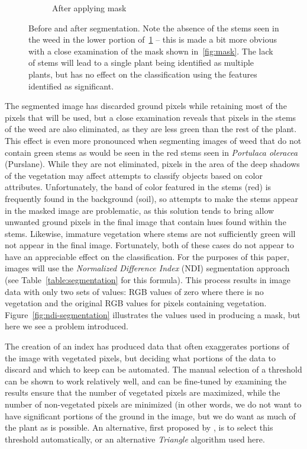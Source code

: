 \documentclass[letterpaper]{article}
\begin{document}
{{\begin{figure}[H]
\begin{subfigure}[h]{.30\textwidth}
	  \caption{After applying mask}
	  \label{fig:original-masked}
	\end{subfigure}
	\caption[Before and after segmentation]{Before and after segmentation. Note the absence of the stems seen in the weed in the lower portion of~\ref{fig:original-masked} -- this is made a bit more obvious with a close examination of the mask shown in~\ref{fig:mask}. The lack of stems will lead to a single plant being identified as multiple plants, but has no effect on the classification using the features identified as significant.}
	\label{fig:segmentation}
\end{figure}
The segmented image has discarded ground pixels while retaining most of the pixels that will be used, but a close examination reveals that pixels in the stems of the weed are also eliminated, as they are less green than the rest of the plant. This effect is even more pronounced when segmenting images of weed that do not contain green stems as would be seen in the red stems seen in \textit{Portulaca oleracea} (Purslane). While they are not eliminated, pixels in the area of the deep shadows of the vegetation may affect attempts to classify objects based on color attributes. Unfortunately, the band of color featured in the stems (red) is frequently found in the background (soil), so attempts to make the stems appear in the masked image are problematic, as this solution tends to bring allow unwanted ground pixels in the final image that contain hues found within the stems. Likewise, immature vegetation where stems are not sufficiently green will not appear in the final image. Fortunately, both of these cases do not appear to have an appreciable effect on the classification. For the purposes of this paper, images will use the \textit{Normalized Difference Index} (NDI) segmentation approach (see Table~\ref{table:segmentation} for this formula). This process results in image data with only two sets of values: RGB values of zero where there is no vegetation and the original RGB values for pixels containing vegetation. Figure~\ref{fig:ndi-segmentation} illustrates the values used in producing a mask, but here we see a problem introduced.

The creation of an index has produced data that often exaggerates portions of the image with vegetated pixels, but deciding what portions of the data to discard and which to keep can be automated. The manual selection of a threshold can be shown to work relatively well, and can be fine-tuned by examining the results ensure that the number of vegetated pixels are maximized, while the number of non-vegetated pixels are minimized (in other words, we do not want to have significant portions of the ground in the image, but we do want as much of the plant as is possible. An alternative, first proposed by \citeauthor*{Otsu1979-io}  \parencite{Otsu1979-io}, is to select this threshold automatically, or an alternative \textit{Triangle} algorithm used here.

}}
\end{document}
